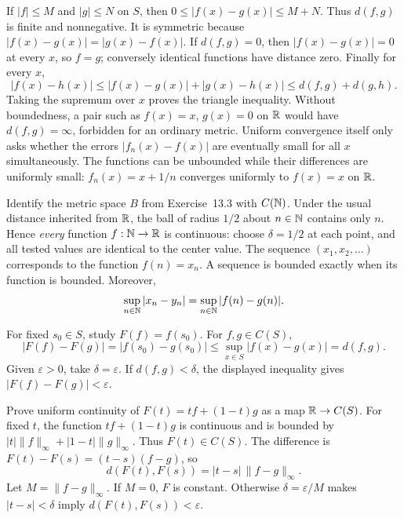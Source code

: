 If $|f|\le M$ and $|g|\le N$ on $S$, then
$0\le|f(x)-g(x)|\le M+N$. Thus $d(f,g)$ is finite and nonnegative.
It is symmetric because $|f(x)-g(x)|=|g(x)-f(x)|$.
If $d(f,g)=0$, then $|f(x)-g(x)|=0$ at every $x$, so $f=g$;
conversely identical functions have distance zero. Finally for every $x$,
\[
 |f(x)-h(x)|\le |f(x)-g(x)|+|g(x)-h(x)|
 \le d(f,g)+d(g,h).
\]
Taking the supremum over $x$ proves the triangle inequality.
Without boundedness, a pair such as $f(x)=x$, $g(x)=0$ on $\mathbb{R}$
would have $d(f,g)=\infty$, forbidden for an ordinary metric.
Uniform convergence itself only asks whether the errors $|f_n(x)-f(x)|$
are eventually small for all $x$ simultaneously. The functions can
be unbounded while their differences are uniformly small: $f_n(x)=x+1/n$
converges uniformly to $f(x)=x$ on $\mathbb{R}$.

\goal Identify the metric space $B$ from Exercise~13.3 with $C(\mathbb{N})$.
Under the usual distance inherited from $\mathbb{R}$, the ball of radius
$1/2$ about $n\in\mathbb{N}$ contains only $n$. Hence \emph{every} function
$f:\mathbb{N}\to\mathbb{R}$ is continuous: choose $\delta=1/2$ at each point, and
all tested values are identical to the center value.
The sequence $(x_1,x_2,\ldots)$ corresponds to the function $f(n)=x_n$.
A sequence is bounded exactly when its function is bounded. Moreover,
\[
 \sup_{n\in\mathbb{N}}|x_n-y_n|
 =\sup_{n\in\mathbb{N}}|f(n)-g(n)|.
\]

\goal For fixed $s_0\in S$, study $F(f)=f(s_0)$.
For $f,g\in C(S)$,
\[
 |F(f)-F(g)|=|f(s_0)-g(s_0)|\le\sup_{x\in S}|f(x)-g(x)|=d(f,g).
\]
Given $\varepsilon>0$, take $\delta=\varepsilon$. If $d(f,g)<\delta$,
the displayed inequality gives $|F(f)-F(g)|<\varepsilon$.

\goal Prove uniform continuity of $F(t)=tf+(1-t)g$ as a map
$\mathbb{R}\to C(S)$.
For fixed $t$, the function $tf+(1-t)g$ is continuous and is bounded
by $|t|\|f\|_\infty+|1-t|\|g\|_\infty$. Thus $F(t)\in C(S)$.
The difference is $F(t)-F(s)=(t-s)(f-g)$, so
\[
 d(F(t),F(s))=|t-s|\,\|f-g\|_\infty.
\]
Let $M=\|f-g\|_\infty$. If $M=0$, $F$ is constant. Otherwise
$\delta=\varepsilon/M$ makes $|t-s|<\delta$ imply
$d(F(t),F(s))<\varepsilon$.

